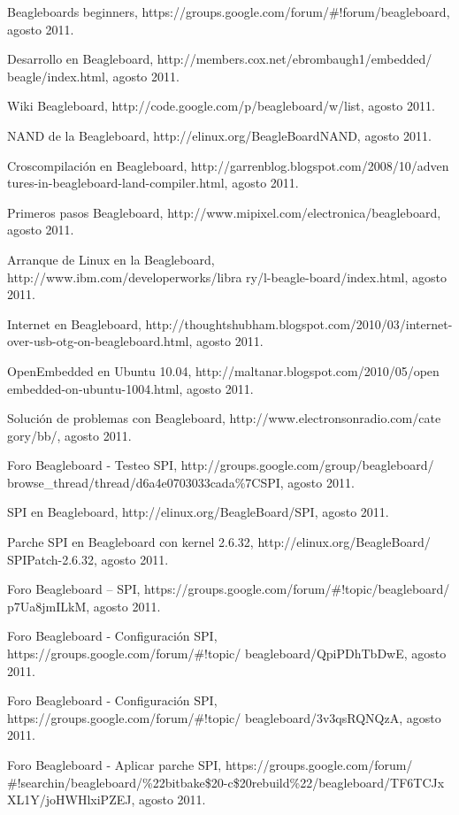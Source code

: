 \begin{thebibliography}{200}
\bibitem{} Beagleboards beginners, https://groups.google.com/forum/\#!forum/beagleboard, agosto 2011.

\bibitem{} Desarrollo en Beagleboard, http://members.cox.net/ebrombaugh1/embedded/
beagle/index.html, agosto 2011.

\bibitem{} Wiki Beagleboard, http://code.google.com/p/beagleboard/w/list, agosto 2011.

\bibitem{} NAND de la Beagleboard, http://elinux.org/BeagleBoardNAND, agosto 2011.

\bibitem{} Croscompilación en Beagleboard, http://garrenblog.blogspot.com/2008/10/adven
tures-in-beagleboard-land-compiler.html, agosto 2011.

\bibitem{} Primeros pasos Beagleboard, http://www.mipixel.com/electronica/beagleboard, agosto 2011.

\bibitem{} Arranque de Linux en la Beagleboard, http://www.ibm.com/developerworks/libra
ry/l-beagle-board/index.html, agosto 2011.

\bibitem{} Internet en Beagleboard, http://thoughtshubham.blogspot.com/2010/03/internet-over-usb-otg-on-beagleboard.html, agosto 2011.

\bibitem{} OpenEmbedded en Ubuntu 10.04, http://maltanar.blogspot.com/2010/05/open
embedded-on-ubuntu-1004.html, agosto 2011.

\bibitem{} Solución de problemas con Beagleboard, http://www.electronsonradio.com/cate
gory/bb/, agosto 2011.

\bibitem{} Foro Beagleboard - Testeo SPI, http://groups.google.com/group/beagleboard/
browse\_thread/thread/d6a4e0703033cada\%7CSPI, agosto 2011.

\bibitem{} SPI en Beagleboard, http://elinux.org/BeagleBoard/SPI, agosto 2011.

\bibitem{} Parche SPI en Beagleboard con kernel 2.6.32, http://elinux.org/BeagleBoard/
SPIPatch-2.6.32, agosto 2011.

\bibitem{} Foro Beagleboard – SPI, https://groups.google.com/forum/\#!topic/beagleboard/
p7Ua8jmILkM, agosto 2011.

\bibitem{} Foro Beagleboard - Configuración SPI, https://groups.google.com/forum/\#!topic/
beagleboard/QpiPDhTbDwE, agosto 2011.

\bibitem{} Foro Beagleboard - Configuración SPI, https://groups.google.com/forum/\#!topic/
beagleboard/3v3qsRQNQzA, agosto 2011.

\bibitem{} Foro Beagleboard - Aplicar parche SPI, https://groups.google.com/forum/
\#!searchin/beagleboard/\%22bitbake\$20-c\$20rebuild\%22/beagleboard/TF6TCJx
XL1Y/joHWHlxiPZEJ, agosto 2011.


\end{thebibliography}
